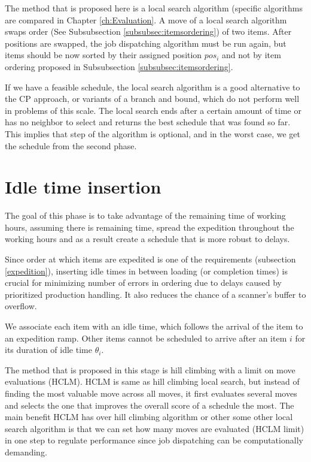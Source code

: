 \documentclass{ctuthesis}
\begin{document}
The method that is proposed here is a local search algorithm (specific algorithms are compared in Chapter \ref{ch:Evaluation}. A move of a local search algorithm swaps order (See Subsubsection \ref{subsubsec:itemsordering}) of two items. After positions are swapped, the job dispatching algorithm must be run again, but items should be now sorted by their assigned position $pos_i$ and not by item ordering proposed in Subsubsection \ref{subsubsec:itemsordering}.

If we have a feasible schedule, the local search algorithm is a good alternative to the CP approach, or variants of a branch and bound, which do not perform well in problems of this scale. The local search ends after a certain amount of time or has no neighbor to select and returns the best schedule that was found so far. This implies that step of the algorithm is optional, and in the worst case, we get the schedule from the second phase.

\section{Idle time insertion}

The goal of this phase is to take advantage of the remaining time of working hours, assuming there is remaining time, spread the expedition throughout the working hours and as a result create a schedule that is more robust to delays. 

Since order at which items are expedited is one of the requirements (subsection \ref{expedition}), inserting idle times in between loading (or completion times) is crucial for minimizing number of errors in ordering due to delays caused by prioritized production handling. It also reduces the chance of a scanner's buffer to overflow.


We associate each item with an idle time, which follows the arrival of the item to an expedition ramp. Other items cannot be scheduled to arrive after an item $i$ for its duration of idle time $\theta_i$.

The method that is proposed in this stage is hill climbing with a limit on move evaluations (HCLM). HCLM is same as hill climbing local search, but instead of finding the most valuable move across all moves, it first evaluates several moves and selects the one that improves the overall score of a schedule the most. The main benefit HCLM has over hill climbing algorithm or other some other local search algorithm is that we can set how many moves are evaluated (HCLM limit) in one step to regulate performance since job dispatching can be computationally demanding.
\end{document}
